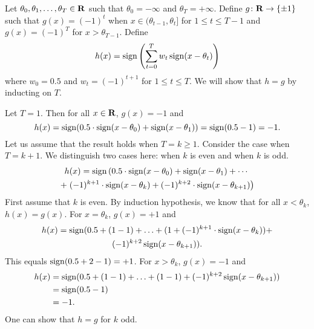Let $\theta_0, \theta_1, \ldots, \theta_{T} \in \mathbf{R}$ such that 
$\theta_0 = -\infty$ and $\theta_{T} = + \infty$. Define 
$g \colon \mathbf{R} \rightarrow \{\pm 1\}$ such that $g(x) = (-1)^t$ 
when $x \in (\theta_{t - 1}, \theta_t]$ for $1 \leq t \leq T - 1$ 
and $g(x) = (-1)^{T}$ for $x > \theta_{T - 1}$. Define
\[
    h(x) =  \operatorname{sign} \left ( \sum_{t = 0}^T w_t \operatorname{sign} (x - \theta_{t} )\right )
\]
where $w_0 = 0.5$ and $w_t = (-1)^{t + 1}$ for $1 \leq t \leq T$. We will show 
that $h = g$ by inducting on $T$.

Let $T = 1$. Then for all $x \in \mathbf{R}$, $g(x) = -1$ and   
\[
h(x) = \operatorname{sign}(0.5 \cdot \operatorname{sign}(x - \theta_0) + \operatorname{sign}(x - \theta_1)) 
     = \operatorname{sign}(0.5 - 1) = -1.
\]
Let us assume that the result holds when $T = k \geq 1$. 
Consider the case when $T = k + 1$. 
We distinguish two cases here: when $k$ is even and when $k$ is odd. 
\begin{multline*}
    h(x) =  \operatorname{sign} \left ( 0.5 \cdot \operatorname{sign} (x - \theta_{0}) 
            + \operatorname{sign}(x - \theta_1) 
            + \cdots \right . \\ 
            + \left . (-1)^{k + 1} \cdot \operatorname{sign}(x - \theta_k) 
            + (-1)^{k + 2} \cdot \operatorname{sign}(x - \theta_{k + 1}) \right )
\end{multline*}
First assume that $k$ is even. By induction hypothesis, we know that 
for all $x < \theta_{k}$, $h(x) = g(x)$. For $x = \theta_k$, $g(x) = +1$
and 
\begin{multline*}
h(x) = \operatorname{sign}( 0.5 + (1 - 1) + \ldots + (1 + (-1)^{k + 1} \cdot \operatorname{sign}(x - \theta_k)) + \\ 
       (-1)^{k + 2} \operatorname{sign}(x - \theta_{k + 1})). 
\end{multline*}
This equals $\operatorname{sign}(0.5 + 2 - 1) = +1$. 
For $x > \theta_{k}$, $g(x) = -1$ and 
\begin{align*}
    h(x) & = \operatorname{sign}(0.5 + (1 - 1) + \ldots + (1 - 1) + (-1)^{k + 2} 
             \operatorname{sign}(x - \theta_{k + 1})) \\
         & = \operatorname{sign}(0.5 - 1) \\
         & = -1.
\end{align*}
One can show that $h = g$ for $k$ odd. 
